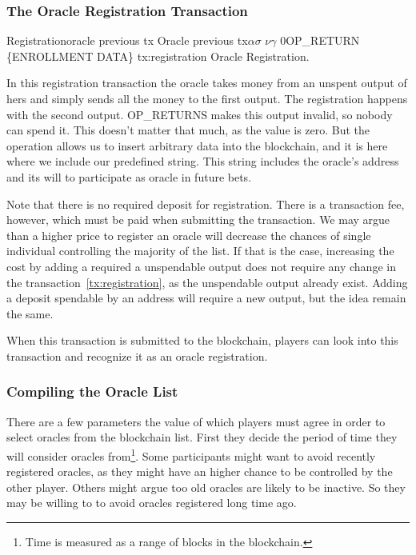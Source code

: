 \subsubsection{The Oracle Registration Transaction}

\transaction
    {Registration}{oracle previous tx}
      {Oracle previous tx}{$\alpha$}{$\sigma$}
      \stopinputs
      {$\nu$}{$\gamma$}
      {$0$}{OP\_RETURN \{ENROLLMENT DATA\}}
      \stopoutputs
      {tx:registration}
      {Oracle Registration.}

In this registration transaction the oracle takes money from an unspent output
  of hers and simply sends all the money to the first output.
The registration happens with the second output. OP\_RETURNS makes this output
  invalid, so nobody can spend it.
This doesn't matter that much, as the value is zero.
But the operation allows us to insert arbitrary data into the blockchain, and it
  is here where we include our predefined string. This string includes the
  oracle's address and its will to participate as oracle in future bets.

Note that there is no required deposit for registration. There is a
  transaction fee, however, which must be paid when submitting the transaction.
We may argue than a higher price to register an oracle will decrease the
  chances of single individual controlling the majority of the list.
If that is the case, increasing the cost by adding a required a unspendable
output does not require any change in the transaction~\ref{tx:registration},
  as the unspendable output already exist.
Adding a deposit spendable by an address will require a new output, but the
  idea remain the same.

When this transaction is submitted to the blockchain, players can look into
  this transaction and recognize it as an oracle registration.

\subsubsection{Compiling the Oracle List}

There are a few parameters the value of which players must agree in order to
  select oracles from the blockchain list.
First they decide the period of time they will consider oracles from\footnote{%
  Time is measured as a range of blocks in the blockchain.}.
Some participants might want to avoid recently registered oracles, as they might
  have an higher chance to be controlled by the other player.
Others might argue too old oracles are likely to be inactive.
So they may be willing to to avoid oracles registered long time ago.


